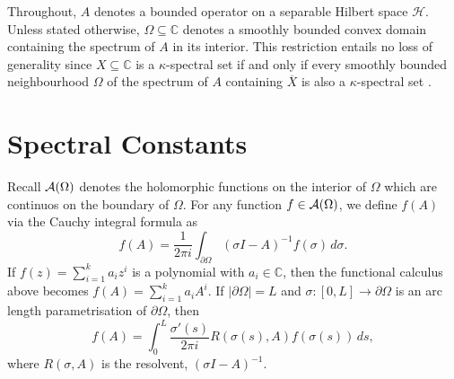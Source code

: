 \documentclass{article}
\begin{document}


Throughout, $A$ denotes a bounded operator on a separable Hilbert space $\mathcal{H}$. Unless stated otherwise, $\Omega \subseteq \mathbb{C}$ denotes a smoothly bounded convex domain containing the spectrum of $A$ in its interior. 
This restriction entails no loss of generality since $X \subseteq \mathbb{C}$ is a $\kappa$-spectral set if and only if every smoothly bounded neighbourhood $\Omega$ of the spectrum of $A$ containing $\overline{X}$ is also a $\kappa$-spectral set \cite{schwenninger2025double}.

\section{Spectral Constants}\label{2}
Recall ${\cal A} ( \Omega )$ denotes the holomorphic functions on the interior of $\Omega$ which are continuos on the boundary of $\Omega$. For any function $f \in {\cal A} ( \Omega ) $, we define $f(A)$ via the Cauchy integral formula as
\[
f(A) = \frac{1}{2 \pi i} \int_{\partial \Omega} ( \sigma I - A )^{-1} f( \sigma )\,d \sigma .
\]
If $f(z) = \sum_{i=1}^k a_iz^i $ is a polynomial with $a_i \in \mathbb{C}$, then the functional calculus above becomes $f(A) = \sum_{i=1}^k a_iA^i$. If $|\partial \Omega| = L$ and $\sigma:  [0, L] \to \partial \Omega$ is an arc length parametrisation of $\partial \Omega$, then
\[
f(A) = \int_0^L \frac{\sigma' (s)}{2 \pi i} R( \sigma (s) , A ) f( \sigma (s))\,ds ,
\]
where $R( \sigma , A )$ is the resolvent, $( \sigma I - A )^{-1}$.
\end{document}

